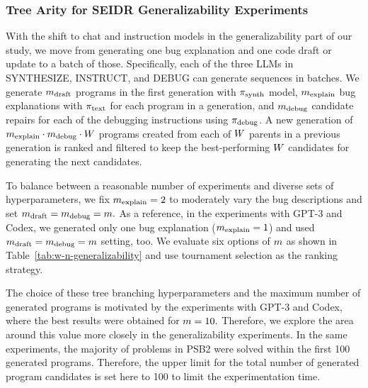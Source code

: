 \subsubsection{Tree Arity for SEIDR Generalizability Experiments}
\label{sec:seidr-tree arity-ollama} 
With the shift to chat and instruction models in the generalizability part of our study, we move from generating one bug explanation and one code draft or update to a batch of those. 
Specifically, each of the three LLMs in SYNTHESIZE, INSTRUCT, and DEBUG  can generate sequences in batches. 
We generate $m_\text{draft}$ programs in the first generation with $ \pi_\text{synth} $ model, $m_\text{explain}$ bug explanations with $ \pi_\text{text} $ for each program in a generation, and $m_\text{debug}$ candidate repairs for each of the debugging instructions using $ \pi_\text{debug} $.
A new generation of $m_\text{explain} \cdot m_\text{debug} \cdot W{}$ programs created from each of $ W{}$ parents in a previous generation is ranked and filtered to keep the best-performing $W{}$ candidates for generating the next candidates. 

To balance between a reasonable number of experiments and diverse sets of hyperparameters, we fix $m_\text{explain}=2$ to moderately vary the bug descriptions and set $m_\text{draft} = m_\text{debug} = m{}.$
As a reference, in the experiments with GPT-3 and Codex, we generated only one bug explanation ($m_\text{explain} = 1$) and used $m_\text{draft} = m_\text{debug} = m{}$ setting, too. 
We evaluate six options of $m{}$ 
as shown in Table~\ref{tab:w-n-generalizability} and use tournament selection as the ranking strategy. 

The choice of these tree branching hyperparameters and the maximum number of generated programs is motivated by the experiments with GPT-3 and Codex, where the best results were obtained for $m{}=10.$ 
Therefore, we explore the area around this value more closely in the generalizability experiments.
In the same experiments, the majority of problems in PSB2 were solved within the first 100 generated programs.
Therefore, the upper limit for the total number of generated program candidates is set here to 100 to limit the experimentation time.

